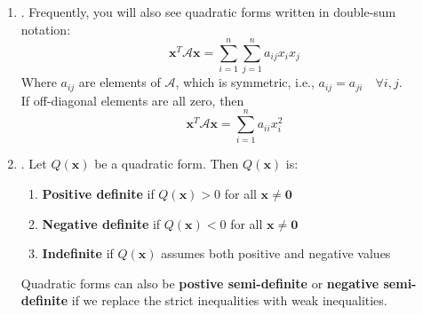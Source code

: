 \documentclass[12pt]{article}
\begin{document}
\begin{enumerate}
\begin{enumerate}
	
	\item\underline{}.
	Frequently, you will also see quadratic forms written in double-sum notation:
		\[\mathbf{x}^T \mathcal{A} \mathbf{x}=\sum_{i=1}^n\sum_{j=1}^na_{ij}x_ix_j\]
	Where $a_{ij}$ are elements of $\mathcal{A}$, which is symmetric, i.e., $a_{ij}=a_{ji}\quad\forall i,j$. \\ 
	If off-diagonal elements are all zero, then 
		\[\mathbf{x}^T \mathcal{A} \mathbf{x}=\sum_{i=1}^n a_{ii}x_i^2 \]
	
	
	\item\underline{}.
	Let $Q(\mathbf{x})$ be a quadratic form. Then $Q(\mathbf{x})$ is:
	\begin{enumerate}
		\item\textbf{Positive definite} if $Q(\mathbf{x})>0$ for all $\mathbf{x}\neq\mathbf{0}$
		\item\textbf{Negative definite} if $Q(\mathbf{x})<0$ for all $\mathbf{x}\neq\mathbf{0}$
		\item\textbf{Indefinite} if $Q(\mathbf{x})$ assumes both positive and negative values
	\end{enumerate}
	Quadratic forms can also be \textbf{postive semi-definite} or \textbf{negative semi-definite} if we replace
	the strict inequalities with weak inequalities.
	

\end{enumerate}
\end{enumerate}
\end{document}
